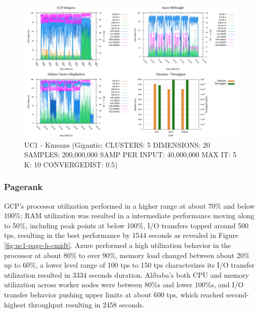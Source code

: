 \documentclass[review]{elsarticle}
\begin{document}
	\begin{figure}[p]
		\caption{UC1 - Kmeans (Gigantic; CLUSTERS: 5 DIMENSIONS: 20 SAMPLES: 200,000,000 SAMP PER INPUT: 40,000,000 MAX IT: 5 K: 10 CONVERGEDIST: 0.5)}
		\label{fig:uc1-kmeans-g-cmidt}
		\includegraphics[width=\textwidth]{uc1-kmeans-g-cmidt}
		\centering
	\end{figure}
	
	
	\subsubsection{Pagerank}
	GCP's processor utilization performed in a higher range at about 70\% and below 100\%; RAM utilization was resulted in a intermediate performance moving along to 50\%, including peak points at below 100\%, I/O transfers topped around 500 tps, resulting in the best performance by 1544 seconds as revealed in Figure \ref{fig:uc1-page-h-cmidt}. Azure performed a high utilization behavior in the processor at about 80\% to over 90\%, memory load changed between about 20\% up to 60\%, a lower level range of 100 tps to 150 tps characterizes its I/O transfer utilization resulted in 3334 seconds duration. Alibaba's both CPU and memory utilization across worker nodes were between 80\%s and lower 100\%s, and I/O transfer behavior pushing upper limits at about 600 tps, which reached second-highest throughput resulting in 2458 seconds.
	
\end{document}
